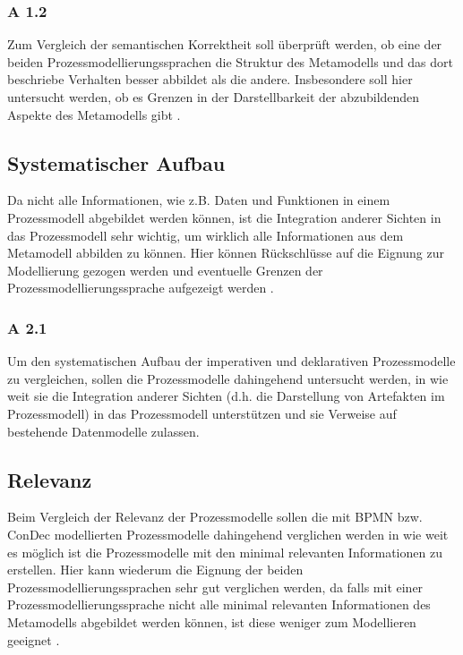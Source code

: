 \subsubsection{A 1.2}

Zum Vergleich der semantischen Korrektheit soll überprüft werden, ob eine der beiden Prozessmodellierungssprachen die Struktur des Metamodells und das dort beschriebe Verhalten besser abbildet als die andere. Insbesondere soll hier untersucht werden, ob es Grenzen in der Darstellbarkeit der abzubildenden Aspekte des Metamodells gibt \cite{journals95, becker2012prozessmanagement}. \newline


\subsection{Systematischer Aufbau}

Da nicht alle Informationen, wie z.B. Daten und Funktionen in einem Prozessmodell abgebildet werden können, ist die Integration anderer Sichten in das Prozessmodell sehr wichtig, um wirklich alle Informationen aus dem Metamodell abbilden zu können. Hier können Rückschlüsse auf die Eignung zur Modellierung gezogen werden und eventuelle Grenzen der Prozessmodellierungssprache aufgezeigt werden \cite{journals95, freund2007, becker2012prozessmanagement,koch2011}.


\subsubsection{A 2.1}
Um den systematischen Aufbau der imperativen und deklarativen Prozessmodelle zu vergleichen, sollen die Prozessmodelle dahingehend untersucht werden, in wie weit sie die Integration anderer Sichten (d.h. die Darstellung von Artefakten im Prozessmodell) in das Prozessmodell unterstützen und sie Verweise auf bestehende Datenmodelle zulassen. 

\subsection{Relevanz}

Beim Vergleich der Relevanz der Prozessmodelle sollen die mit BPMN bzw. ConDec modellierten Prozessmodelle dahingehend verglichen werden in wie weit es möglich ist die Prozessmodelle mit den minimal relevanten Informationen zu erstellen. Hier kann wiederum die Eignung der beiden Prozessmodellierungssprachen sehr gut verglichen werden, da falls mit einer Prozessmodellierungssprache nicht alle minimal relevanten Informationen des Metamodells abgebildet werden können, ist diese weniger zum Modellieren geeignet \cite{journals95, freund2007,reinshagen2009}. 

